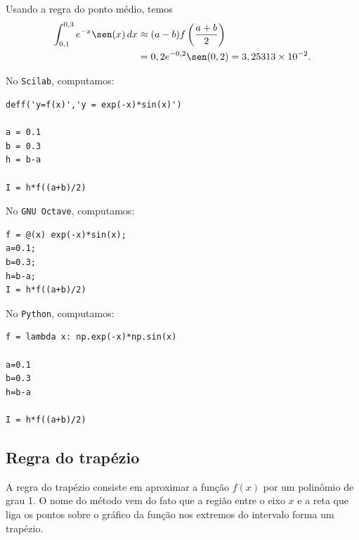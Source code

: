 \begin{ex}
  Usando a regra do ponto médio, temos
  \begin{equation}
    \begin{split}
    \int_{0,1}^{0,3} e^{-x}\sen(x)\,dx &\approx (a-b) f\left(\frac{a+b}{2}\right) \\
    &= 0,2e^{-0,2}\sen(0,2) = 3,25313\times 10^{-2}.
    \end{split}
  \end{equation}

\ifisscilab
No \verb+Scilab+, computamos:
\begin{verbatim}
deff('y=f(x)','y = exp(-x)*sin(x)')

a = 0.1
b = 0.3
h = b-a

I = h*f((a+b)/2)
\end{verbatim}
\fi
\ifisoctave
No \verb+GNU Octave+, computamos:
\begin{verbatim}
f = @(x) exp(-x)*sin(x);
a=0.1;
b=0.3;
h=b-a;
I = h*f((a+b)/2)
\end{verbatim}
\fi
\ifispython
No \verb+Python+, computamos:
\begin{verbatim}
f = lambda x: np.exp(-x)*np.sin(x)

a=0.1
b=0.3
h=b-a

I = h*f((a+b)/2)
\end{verbatim}
\fi
\end{ex}



\subsection{Regra do trapézio}\label{sec:trapezio}

A regra do trapézio consiste em aproximar a função $f(x)$ por um polinômio de grau 1. O nome do método vem do fato que a região entre o eixo $x$ e a reta que liga os pontos sobre o gráfico da função nos extremos do intervalo forma um trapézio.


